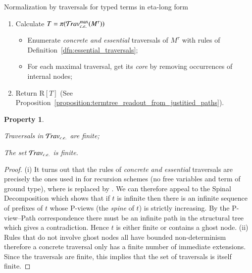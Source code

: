 \documentclass{elsarticle}
\theoremstyle{plain}
\newtheorem{property}[theorem]{Property}
\theoremstyle{definition}
\newcommand{\travsetcones}{\travset_{c.e.}} %
\def\readout{\mathrm{R}} %
\def\coresymbol{\pi} %
\newcommand{\core}[1]{\coresymbol(#1)} %
\begin{document}
\begin{algorithm}[!ht]
\caption{Normalization by traversals for typed terms in eta-long form}
\label{algo:stlc_normalization_by_traversals}
\begin{algorithmic}
\begin{enumerate}[nosep]
  \item Calculate $T = \core{\travsetcones^{\max}(M^\tau)}$
  \begin{itemize}[nosep]
    \item Enumerate \emph{concrete and essential} traversals of $M^\tau$ with rules of Definition~\ref{dfn:essential_traversals};
    \item For each maximal traversal, get its \emph{core} by removing occurrences of internal nodes;
  \end{itemize}
  \item Return $\readout[T]$ (See Proposition~\ref{proposition:termtree_readout_from_justitied_paths}).
\end{enumerate}
\end{algorithmic}
\end{algorithm}

\begin{property}
    \label{prop:concrete_essential_trav_finite}
    \begin{enumerate*}
        \item[(i)] Traversals in $\travsetcones$ are finite;
        \item[(ii)] The set $\travsetcones$ is finite.
    \end{enumerate*}
    \end{property}
    \begin{proof}
    (i) It turns out that the rules of \emph{concrete and essential} traversals are precisely the ones used in \cite{OngLics2006} for recursion schemes (no free variables and term of ground type), where  is replaced by . We can therefore appeal to the Spinal Decomposition
    \cite[Lemma 8]{OngLics2006} which shows that if $t$ is infinite then there is an infinite sequence of prefixes of $t$ whose P-views (the \emph{spine} of $t$) is strictly increasing. By the P-view--Path correspondence there must be an infinite path in the structural tree which gives a contradiction. Hence $t$ is either finite or contains a ghost node.
    (ii) Rules that do not involve ghost nodes all have bounded non-determinism therefore a concrete traversal only has a finite number of immediate extensions. Since the traversals are finite, this implies that the set of traversals is itself finite.
\end{proof}
\end{document}
